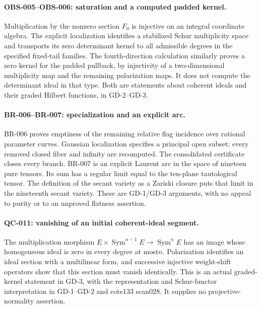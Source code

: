 \paragraph{OBS-005--OBS-006: saturation and a computed padded kernel.}
Multiplication by the nonzero section $F_0$ is injective on an integral
coordinate algebra. The explicit localization identifies a stabilized
Schur multiplicity space and transports its zero determinant kernel
to all admissible degrees in the specified fixed-tail families.
The fourth-direction calculation similarly proves a zero kernel for
the padded pullback, by injectivity of a two-dimensional multiplicity
map and the remaining polarization maps. It does not compute the
determinant ideal in that type. Both are statements about coherent
ideals and their graded Hilbert functions, in GD-2--GD-3.

\paragraph{BR-006--BR-007: specialization and an explicit arc.}
BR-006 proves emptiness of the remaining
relative flag incidence over rational parameter curves. Gaussian
localization specifies a principal open subset; every removed closed
fiber and infinity are recomputed. The consolidated certificate
closes every branch. BR-007 is an
explicit Laurent arc in the space of nineteen pure tensors. Its sum
has a regular limit equal to the ten-plane tautological tensor.
The definition of the secant variety as a Zariski closure puts that
limit in the nineteenth secant variety. These are GD-1/GD-3 arguments,
with no appeal to purity or to an unproved flatness assertion.

\paragraph{QC-011: vanishing of an initial coherent-ideal segment.}
The multiplication morphism $E\times\operatorname{Sym}^{n-1}E\to
\operatorname{Sym}^nE$ has an image whose homogeneous ideal is zero
in every degree at most$n$. Polarization identifies an ideal section
with a multilinear form, and successive injective weight-shift
operators show that this section must vanish identically. This is
an actual graded-kernel statement in GD-3, with the representation
and Schur-functor interpretation in GD-1--GD-2 and cote133 scan028.
It supplies no projective-normality assertion.

